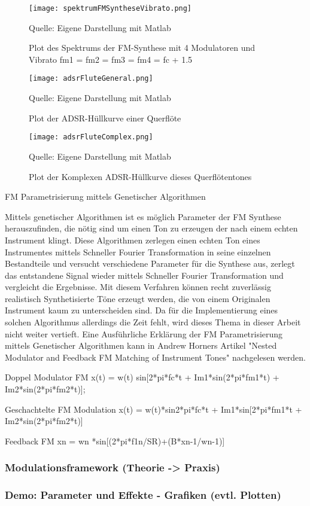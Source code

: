 \begin{figure} [ht]
\centering
  \texttt{[image: spektrumFMSyntheseVibrato.png]}
\caption{Plot des Spektrums der FM-Synthese mit 4 Modulatoren und Vibrato fm1 = fm2 = fm3 = fm4 = fc + 1.5}
\label{fig:spektrumFMSyntheseVibrato}
Quelle: Eigene Darstellung mit Matlab
\end{figure}

\begin{figure} [ht]
\centering
  \texttt{[image: adsrFluteGeneral.png]}
\caption{Plot der ADSR-Hüllkurve einer Querflöte}
\label{fig:adsrFluteGeneral}
Quelle: Eigene Darstellung mit Matlab
\end{figure}

\begin{figure} [ht]
\centering
  \texttt{[image: adsrFluteComplex.png]}
\caption{Plot der Komplexen ADSR-Hüllkurve dieses Querflötentones}
\label{fig:adsrFluteComplex}
Quelle: Eigene Darstellung mit Matlab
\end{figure}

\FloatBarrier

FM Parametrisierung mittels Genetischer Algorithmen

Mittels genetischer Algorithmen ist es möglich Parameter der FM Synthese herauszufinden, die nötig sind um einen Ton zu erzeugen der nach einem echten Instrument klingt. Diese Algorithmen zerlegen einen echten Ton eines Instrumentes mittels Schneller Fourier Transformation in seine einzelnen Bestandteile und versucht verschiedene Parameter für die Synthese aus, zerlegt das entstandene Signal wieder mittels Schneller Fourier Transformation und vergleicht die Ergebnisse. Mit diesem Verfahren können recht zuverlässig realistisch Synthetisierte Töne erzeugt werden, die von einem Originalen Instrument kaum zu unterscheiden sind. Da für die Implementierung eines solchen Algorithmus allerdings die Zeit fehlt, wird dieses Thema in dieser Arbeit nicht weiter vertieft. Eine Ausführliche Erklärung der FM Parametrisierung mittels Genetischer Algorithmen kann in Andrew Horners Artikel "Nested Modulator and Feedback FM Matching of Instrument Tones" nachgelesen werden.


Doppel Modulator FM
x(t) = w(t) sin[2*pi*fc*t + Im1*sin(2*pi*fm1*t) + Im2*sin(2*pi*fm2*t)];

Geschachtelte FM Modulation
x(t) = w(t)*sin{2*pi*fc*t + Im1*sin[2*pi*fm1*t + Im2*sin(2*pi*fm2*t)]}

Feedback FM 
xn = wn *sin[(2*pi*f1n/SR)+(B*xn-1/wn-1)]

\FloatBarrier
\subsubsection{Modulationsframework (Theorie -> Praxis)}
\FloatBarrier
\subsubsection{Demo: Parameter und Effekte - Grafiken (evtl. Plotten)}